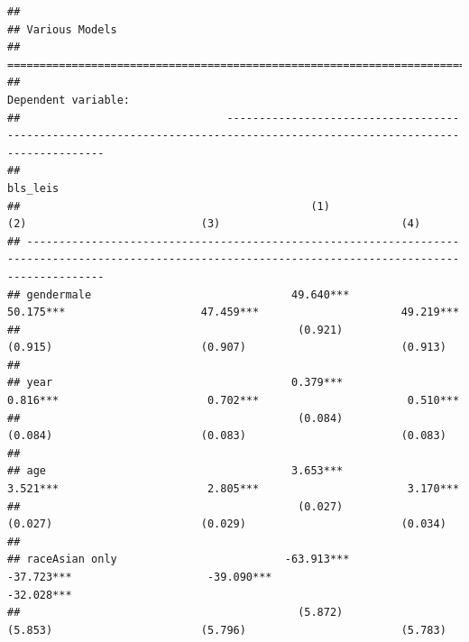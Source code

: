\documentclass[
]{article}
\begin{document}
\begin{verbatim}
## 
## Various Models
## ========================================================================================================================================================
##                                                                                   Dependent variable:                                                   
##                                -------------------------------------------------------------------------------------------------------------------------
##                                                                                        bls_leis                                                         
##                                             (1)                           (2)                           (3)                            (4)              
## --------------------------------------------------------------------------------------------------------------------------------------------------------
## gendermale                               49.640***                     50.175***                     47.459***                      49.219***           
##                                           (0.921)                       (0.915)                       (0.907)                        (0.913)            
##                                                                                                                                                         
## year                                     0.379***                      0.816***                       0.702***                       0.510***           
##                                           (0.084)                       (0.084)                       (0.083)                        (0.083)            
##                                                                                                                                                         
## age                                      3.653***                      3.521***                       2.805***                       3.170***           
##                                           (0.027)                       (0.027)                       (0.029)                        (0.034)            
##                                                                                                                                                         
## raceAsian only                          -63.913***                    -37.723***                     -39.090***                     -32.028***          
##                                           (5.872)                       (5.853)                       (5.796)                        (5.783)            

\end{verbatim}
\end{document}
